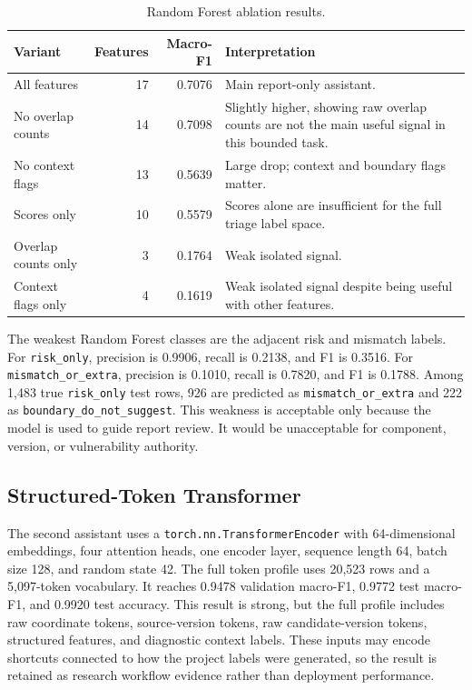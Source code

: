 \begin{table}[H]
\centering
\caption{Random Forest ablation results.}
\label{tab:pfe-ai-rf-ablation}
\begin{tabularx}{\textwidth}{L{0.34\textwidth}r r X}
\toprule
\textbf{Variant} & \textbf{Features} & \textbf{Macro-F1} &
\textbf{Interpretation}\\
\midrule
All features & 17 & 0.7076 & Main report-only assistant.\\
No overlap counts & 14 & 0.7098 & Slightly higher, showing raw overlap counts
are not the main useful signal in this bounded task.\\
No context flags & 13 & 0.5639 & Large drop; context and boundary flags matter.\\
Scores only & 10 & 0.5579 & Scores alone are insufficient for the full
triage label space.\\
Overlap counts only & 3 & 0.1764 & Weak isolated signal.\\
Context flags only & 4 & 0.1619 & Weak isolated signal despite being useful
with other features.\\
\bottomrule
\end{tabularx}
\end{table}

The weakest Random Forest classes are the adjacent risk and mismatch labels.
For \texttt{risk\_only}, precision is 0.9906, recall is 0.2138, and F1 is
0.3516. For \texttt{mismatch\_or\_extra}, precision is 0.1010, recall is
0.7820, and F1 is 0.1788. Among 1,483 true \texttt{risk\_only} test rows, 926
are predicted as \texttt{mismatch\_or\_extra} and 222 as
\texttt{boundary\_do\_not\_suggest}. This weakness is acceptable only because
the model is used to guide report review. It would be unacceptable for
component, version, or vulnerability authority.

\subsection{Structured-Token Transformer}

The second assistant uses a \texttt{torch.nn.TransformerEncoder} with
64-dimensional embeddings, four attention heads, one encoder layer, sequence
length 64, batch size 128, and random state 42. The full token profile uses
20,523 rows and a 5,097-token vocabulary. It reaches 0.9478 validation
macro-F1, 0.9772 test macro-F1, and 0.9920 test accuracy. This result is
strong, but the full profile includes raw coordinate tokens, source-version
tokens, raw candidate-version tokens, structured features, and diagnostic
context labels. These inputs may encode shortcuts connected to how the project
labels were generated, so the result is retained as research workflow
evidence rather than deployment performance.

